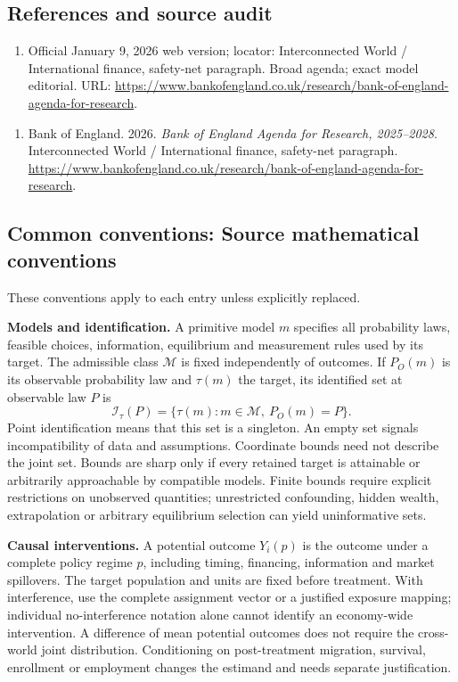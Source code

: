 \documentclass[11pt,a4paper]{article}
\begin{document}
\subsection*{References and source audit}
\begin{enumerate}
\item Official January 9, 2026 web version; locator: Interconnected World / International finance, safety-net paragraph. Broad agenda; exact model editorial. URL: \url{https://www.bankofengland.co.uk/research/bank-of-england-agenda-for-research}.
\end{enumerate}
\begin{enumerate}\raggedright
\item\hypertarget{definitions:source:30007621:1}{} Bank of England. 2026. \emph{Bank of England Agenda for Research, 2025–2028}. Interconnected World / International finance, safety-net paragraph.
\url{https://www.bankofengland.co.uk/research/bank-of-england-agenda-for-research}.
\end{enumerate}

\subsection*{Common conventions: Source mathematical conventions}

These conventions apply to each entry unless explicitly replaced.

\textbf{Models and identification.} A primitive model \(m\) specifies all probability laws, feasible choices, information, equilibrium and measurement rules used by its target. The admissible class \(\mathcal M\) is fixed independently of outcomes. If \(P_O(m)\) is its observable probability law and \(\tau(m)\) the target, its identified set at observable law \(P\) is
\[
 \mathcal I_\tau(P)=\{\tau(m):m\in\mathcal M,\ P_O(m)=P\}.
\]
Point identification means that this set is a singleton. An empty set signals incompatibility of data and assumptions. Coordinate bounds need not describe the joint set. Bounds are sharp only if every retained target is attainable or arbitrarily approachable by compatible models. Finite bounds require explicit restrictions on unobserved quantities; unrestricted confounding, hidden wealth, extrapolation or arbitrary equilibrium selection can yield uninformative sets.

\textbf{Causal interventions.} A potential outcome \(Y_i(p)\) is the outcome under a complete policy regime \(p\), including timing, financing, information and market spillovers. The target population and units are fixed before treatment. With interference, use the complete assignment vector or a justified exposure mapping; individual no-interference notation alone cannot identify an economy-wide intervention. A difference of mean potential outcomes does not require the cross-world joint distribution. Conditioning on post-treatment migration, survival, enrollment or employment changes the estimand and needs separate justification.
\end{document}
